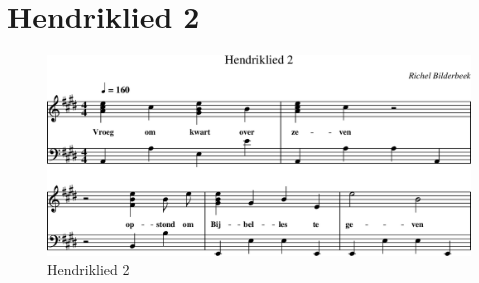 \chapter{Hendriklied 2}



\begin{figure}[!htbp]
  \includegraphics[width=\textwidth,height=\textheight,keepaspectratio]{../songs/10_hendriklied_2.png}
  \caption{Hendriklied 2}
  \label{fig:10_hendriklied_2}
\end{figure}
